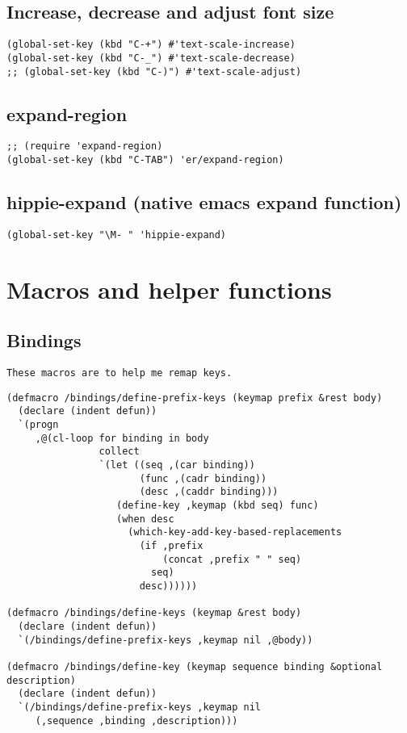 \documentclass[11pt]{article}
\begin{document}
\subsection*{Increase, decrease and adjust font size}
\label{sec:org3fc381f}

\begin{verbatim}
(global-set-key (kbd "C-+") #'text-scale-increase)
(global-set-key (kbd "C-_") #'text-scale-decrease)
;; (global-set-key (kbd "C-)") #'text-scale-adjust)
\end{verbatim}

\subsection*{expand-region}
\label{sec:orgc98d361}
\begin{verbatim}
;; (require 'expand-region)
(global-set-key (kbd "C-TAB") 'er/expand-region)
\end{verbatim}

\subsection*{hippie-expand (native emacs expand function)}
\label{sec:orgfff8450}

\begin{verbatim}
(global-set-key "\M- " 'hippie-expand)
\end{verbatim}


\section*{Macros and helper functions}
\label{sec:orgf14d985}

\subsection*{Bindings}
\label{sec:orgb1e89d6}


\begin{verbatim}
These macros are to help me remap keys.
\end{verbatim}


\begin{verbatim}
(defmacro /bindings/define-prefix-keys (keymap prefix &rest body)
  (declare (indent defun))
  `(progn
     ,@(cl-loop for binding in body
                collect
                `(let ((seq ,(car binding))
                       (func ,(cadr binding))
                       (desc ,(caddr binding)))
                   (define-key ,keymap (kbd seq) func)
                   (when desc
                     (which-key-add-key-based-replacements
                       (if ,prefix
                           (concat ,prefix " " seq)
                         seq)
                       desc))))))

(defmacro /bindings/define-keys (keymap &rest body)
  (declare (indent defun))
  `(/bindings/define-prefix-keys ,keymap nil ,@body))

(defmacro /bindings/define-key (keymap sequence binding &optional description)
  (declare (indent defun))
  `(/bindings/define-prefix-keys ,keymap nil
     (,sequence ,binding ,description)))
\end{verbatim}
\end{document}
